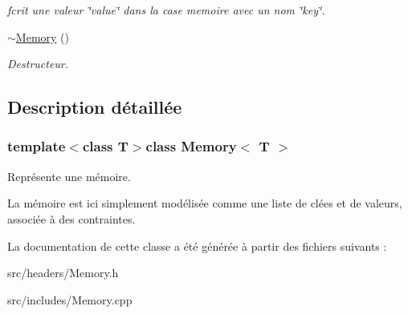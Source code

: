 \begin{DoxyCompactItemize}
\begin{DoxyCompactList}\small\item\em ƒcrit une valeur \char`\"{}value\char`\"{} dans la case memoire avec un nom \char`\"{}key\char`\"{}. \end{DoxyCompactList}\item 
\hypertarget{classMemory_a2d153fdede89954dc0875ab6c8d804c3}{\hyperlink{classMemory_a2d153fdede89954dc0875ab6c8d804c3}{$\sim$\-Memory} ()}\label{classMemory_a2d153fdede89954dc0875ab6c8d804c3}

\begin{DoxyCompactList}\small\item\em Destructeur. \end{DoxyCompactList}\end{DoxyCompactItemize}


\subsection{Description détaillée}
\subsubsection*{template$<$class T$>$class Memory$<$ T $>$}

Représente une mémoire. 

La mémoire est ici simplement modélisée comme une liste de clées et de valeurs, associée à des contraintes. 

La documentation de cette classe a été générée à partir des fichiers suivants \-:\begin{DoxyCompactItemize}
\item 
src/headers/Memory.\-h\item 
src/includes/Memory.\-cpp\end{DoxyCompactItemize}
